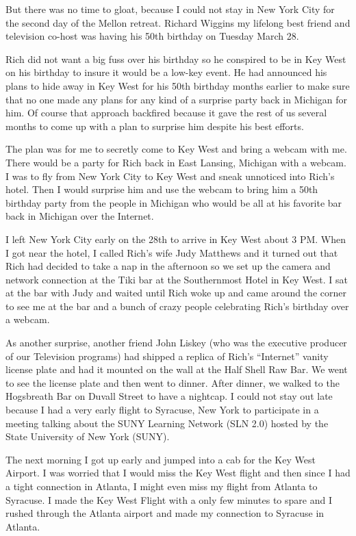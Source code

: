 \documentclass[12pt]{book}
\begin{document}
But there was no time to gloat, because I could not
stay in New York City for the second day of the Mellon
retreat.  Richard Wiggins my lifelong best friend
and television co-host was having his 50th birthday
on Tuesday March 28.

Rich did not want a big fuss over his birthday so he
conspired to be in Key West on his birthday to insure it
would be a low-key event.   He had announced his plans
to hide away in Key West for his 50th birthday months
earlier to make sure that no one made any plans for
any kind of a surprise party back in Michigan for him.
Of course that approach backfired because it gave the
rest of us several months to come up with a plan to
surprise him despite his best efforts.

The plan was for me to secretly come to Key West and
bring a webcam with me.  There would be a party for
Rich back in East Lansing, Michigan with a webcam.  I
was to fly from New York City to Key West and sneak
unnoticed into Rich's hotel.
Then I would surprise him and use the webcam to
bring him a 50th birthday party from the people in
Michigan who would be all at his favorite bar back in
Michigan over the Internet.

I left New York City early on
the 28th to arrive in Key West about 3 PM.   When I
got near the hotel, I called Rich's wife Judy Matthews
and it turned out that Rich had decided to take a nap in
the afternoon so we set up the camera and network
connection at the Tiki bar at the Southernmost Hotel
in Key West.   I sat at the bar with Judy and waited
until Rich woke up and came around the corner to see
me at the bar and a bunch of crazy people celebrating
Rich's birthday over a webcam.

As another surprise, another friend John Liskey
(who was the executive producer of our Television
programs)
had shipped a replica of Rich's ``Internet'' vanity
license plate and had it mounted on the wall at the
Half Shell Raw Bar.
We went to see the license plate and then
went to dinner.  After dinner, we walked to the
Hogsbreath Bar on Duvall Street to have a nightcap.
I could not stay out late because I had a very early
flight to Syracuse, New York to participate in a
meeting talking about the
SUNY Learning Network (SLN 2.0) hosted by the
State University of New York (SUNY).

The next morning I got up early and jumped
into a cab for the Key West Airport.
I was worried that I would miss the Key West flight and
then since I had a tight connection in Atlanta, I
might even miss my flight from Atlanta to Syracuse.
I made the Key West Flight with a only few minutes to spare
and I rushed through the Atlanta airport and made my
connection to Syracuse in Atlanta.
\end{document}
